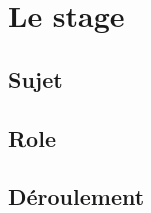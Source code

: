 \documentclass[../main.tex]{subfiles}
\begin{document}
    \chapter{Le stage}
    \section{Sujet}
    \section{Role}
    \section{Déroulement}
\end{document}
